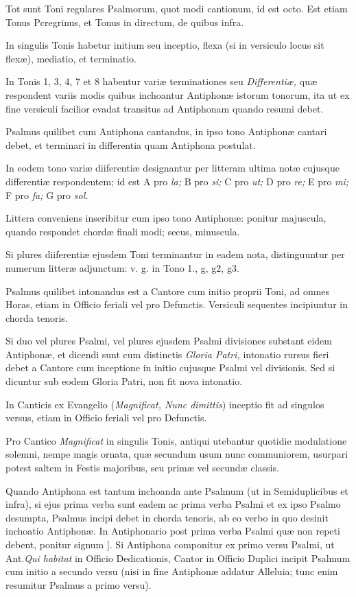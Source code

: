 \documentclass[vesperale_romanum.tex]{subfiles}
\begin{document}
Tot sunt Toni regulares Psalmorum, quot modi cantionum, id est octo. Est etiam Tonus Pcregrinus, et Tonus in directum, de quibus infra.

In singulis Tonis habetur initium seu inceptio, flexa (si in versiculo locus sit flexæ), mediatio, et terminatio.

In Tonis 1, 3, 4, 7 et 8 habentur variæ terminationes seu \textit{Differentiæ,} quæ respondent variis modis quibus inchoantur Antiphonæ istorum tonorum, ita ut ex fine versiculi facilior evadat transitus ad Antiphonam quando resumi debet.

Psalmus quilibet cum Antiphona cantandus, in ipso tono Antiphonæ cantari debet, et terminari in differentia quam Antiphona postulat.

In eodem tono variæ diiferentiæ designantur per litteram ultima notæ cujusque differentiæ respondentem; id est A pro \textit{la;} B pro \textit{si;}
C pro \textit{ut;} D pro \textit{re;} E pro \textit{mi;} F pro \textit{fa;} G pro \textit{sol.}

Littera conveniens inseribitur cum ipso tono Antiphonæ: ponitur majuscula, quando respondet chordæ finali modi; secus, minuscula.

Si plures diiferentiæ ejusdem Toni terminantur in eadem nota, distinguuntur per numerum litteræ adjunctum: v. g. in Tono 1., g, g2, g3.

Psalmus quilibet intonandus est a Cantore cum initio proprii Toni, ad omnes Horas, etiam in Officio feriali vel pro Defunctis. Versiculi sequentes incipiuntur in chorda tenoris.

Si duo vel plures Psalmi, vel plures ejusdem Psalmi divisiones substant eidem Antiphonæ, et dicendi sunt cum distinctis \textit{Gloria Patri,} intonatio rursus fieri debet a Cantore cum inceptione in initio cujusque Psalmi vel divisionis. Sed si dicuntur sub eodem Gloria Patri, non fit nova intonatio.

In Canticis ex Evangelio (\textit{Magnificat, Nunc dimittis}) inceptio fit ad singulos versus, etiam in Officio feriali vel pro Defunctis.

Pro Cantico \textit{Magnificat} in singulis Tonis, antiqui utebantur quotidie modulatione solemni, nempe magis ornata, quæ secundum usum nunc communiorem, usurpari potest saltem in Festis majoribus, seu primæ vel secundæ classis.

Quando Antiphona est tantum inchoanda ante Psalmum (ut in Semiduplicibus et infra), si ejus prima verba sunt eadem ac prima verba Psalmi et ex ipso Psalmo desumpta, Psalmus incipi debet in chorda tenoris, ab eo verbo in quo desinit inchoatio Antiphonæ. In Antiphonario post prima verba Psalmi quæ non repeti debent, ponitur signum ]. Si Antiphona componitur ex primo versu Psalmi, ut Ant.\@ \textit{Qui habitat }in Officio Dedicationis, Cantor in Officio Duplici incipit Psalmum cum initio a secundo versu (nisi in fine Antiphonæ addatur Alleluia; tunc enim resumitur Psalmus a primo versu).
\end{document}
